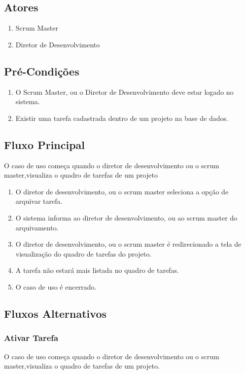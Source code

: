 \subsection{Atores}

\begin{enumerate}
  \item Scrum Master
  \item Diretor de Desenvolvimento
\end{enumerate}

\subsection{Pré-Condições}
\begin{enumerate}
  \item O Scrum Master, ou o Diretor de Desenvolvimento deve estar logado no sistema.
  \item Existir uma tarefa cadastrada dentro de um projeto na base de dados.
\end{enumerate}

\subsection{Fluxo Principal}
O caso de uso começa quando o diretor de desenvolvimento ou o scrum master,visualiza o quadro de tarefas de um projeto

\begin{enumerate}
  \item O diretor de desenvolvimento, ou o scrum master seleciona a opção de arquivar tarefa.
  \item O sistema informa ao diretor de desenvolvimento, ou ao scrum master do arquivamento.
  \item O diretor de desenvolvimento, ou o scrum master é redirecionado a tela de visualização do quadro de tarefas do projeto.
  \item A tarefa não estará mais listada no quadro de tarefas.
  \item O caso de uso é encerrado.
\end{enumerate}

\subsection{Fluxos Alternativos}

\subsubsection{Ativar Tarefa}
O caso de uso começa quando o diretor de desenvolvimento ou o scrum master,visualiza o quadro de tarefas de um projeto.

